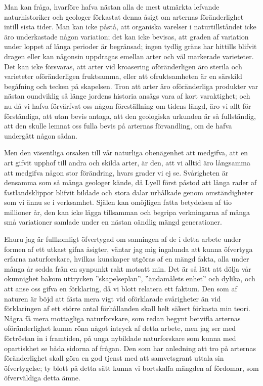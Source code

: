 Man kan fråga, hvarföre hafva nästan alla de mest utmärkta lefvande naturhistoriker och geologer förkastat denna åsigt om arternas föränderlighet intill sista tider. Man kan icke påstå, att organiska varelser i naturtillståndet icke äro underkastade någon variation; det kan icke bevisas, att graden af variation under loppet af långa perioder är begränsad; ingen tydlig gräns har hittills blifvit dragen eller kan någonsin uppdragas emellan arter och väl markerade varieteter. Det kan icke försvaras, att arter vid kroasering oföränderligen äro sterila och varieteter oföränderligen fruktsamma, eller att ofruktsamheten är en särskild begåfning och tecken på skapelsen. Tron att arter äro oföränderliga produkter var nästan oundviklig så länge jordens historia ansågs vara af kort varaktighet; och nu då vi hafva förvärfvat oss någon föreställning om tidens längd, äro vi allt för förståndiga, att utan bevis antaga, att den geologiska urkunden är så fullständig, att den skulle lemnat oss fulla bevis på arternas förvandling, om de hafva undergått någon sådan.

Men den väsentliga orsaken till vår naturliga obenägenhet att medgifva, att en art gifvit upphof till andra och skilda arter, är den, att vi alltid äro långsamma att medgifva någon stor förändring, hvars grader vi ej se. Svårigheten är densamma som så många geologer kände, då Lyell först påstod att långa rader af fastlandsklippor blifvit bildade och stora dalar urhålkade genom omständigheter som vi ännu se i verksamhet. Själen kan omöjligen fatta betydelsen af tio millioner år, den kan icke lägga tillsamman och begripa verkningarna af många små variationer samlade under en nästan oändlig mängd generationer.

Ehuru jag är fullkomligt öfvertygad om sanningen af de i detta arbete under formen af ett utkast gifna åsigter, väntar jag mig ingalunda att kunna öfvertyga erfarna naturforskare, hvilkas kunskaper utgöras af en mängd fakta, alla under många år sedda från en synpunkt rakt motsatt min. Det är så lätt att dölja vår okunnighet bakom uttrycken ”skapelseplan”, ”ändamålets enhet” och dylika, och att anse oss gifva en förklaring, då vi blott relatera ett faktum. Den som af naturen är böjd att fästa mera vigt vid oförklarade svårigheter än vid förklaringen af ett större antal förhållanden skall helt säkert förkasta min teori. Några få mera mottagliga naturforskare, som redan begynt betvifla arternas oföränderlighet kunna röna något intryck af detta arbete, men jag ser med förtröstan in i framtiden, på unga nybildade naturforskare som kunna med opartiskhet se båda sidorna af frågan. Den som har anledning att tro på arternas föränderlighet skall göra en god tjenst med att samvetsgrant uttala sin öfvertygelse; ty blott på detta sätt kunna vi bortskaffa mängden af fördomar, som öfverväldiga detta ämne.

